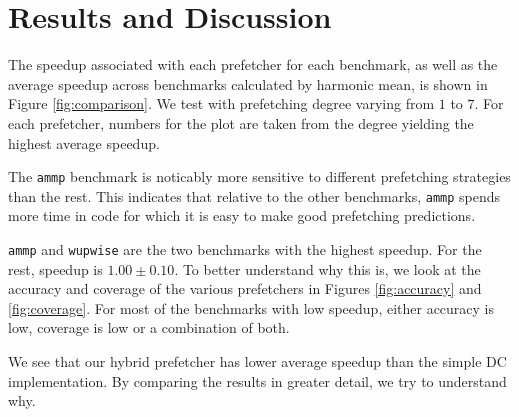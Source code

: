 \section{Results and Discussion}
\label{sec:results-and-discussion}

The speedup associated with each prefetcher for each benchmark, as
well as the average speedup across benchmarks calculated by harmonic
mean, is shown in Figure \ref{fig:comparison}. We test with
prefetching degree varying from $1$ to $7$. For each prefetcher,
numbers for the plot are taken from the degree yielding the highest
average speedup.

The \texttt{ammp} benchmark is noticably more sensitive to different
prefetching strategies than the rest. This indicates that relative to
the other benchmarks, \texttt{ammp} spends more time in code for which
it is easy to make good prefetching predictions.

\texttt{ammp} and \texttt{wupwise} are the two benchmarks with the
highest speedup.  For the rest, speedup is $1.00\pm0.10$. To better
understand why this is, we look at the accuracy and coverage of the
various prefetchers in Figures \ref{fig:accuracy} and
\ref{fig:coverage}. For most of the benchmarks with low
speedup, either accuracy is low, coverage is low or a combination of
both.

We see that our hybrid prefetcher has lower average speedup than the
simple DC implementation.  By comparing the results in greater detail,
we try to understand why.

